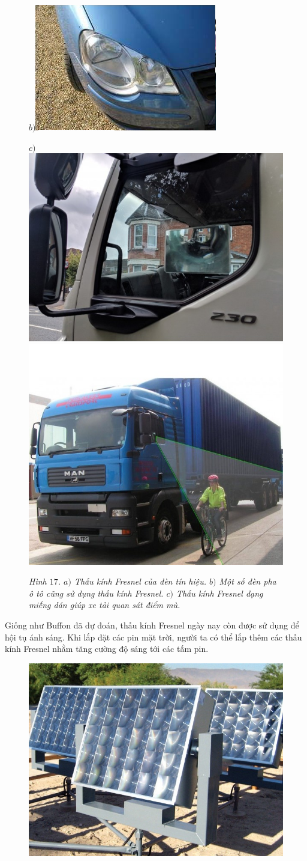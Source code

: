 \begin{multicols}{2}
\begin{figure}[H]
		$b)$\includegraphics[height= 0.3\linewidth]{18b}
		
		$c)$\includegraphics[height= 0.36\linewidth]{18c}
		\includegraphics[height= 0.365\linewidth]{18d}
		\caption{\small\textit{\color{timhieukhoahoc}Hình $17$. $a)$ Thấu kính Fresnel của đèn tín hiệu. $b)$ Một số đèn pha ô tô cũng sử dụng thấu kính Fresnel. $c)$ Thấu kính Fresnel dạng miếng dán giúp xe tải quan sát điểm mù.}}
		\vspace*{-5pt}
	\end{figure}
	Giống như Buffon đã dự đoán, thấu kính Fresnel ngày nay còn được sử dụng để hội tụ ánh sáng. Khi lắp đặt các pin mặt trời, người ta có thể lắp thêm các thấu kính Fresnel nhằm tăng cường độ sáng tới các tấm pin. 
	\begin{figure}[H]
		\vspace*{-5pt}
		\centering
		\captionsetup{labelformat= empty, justification=centering}
		\includegraphics[width= 1\linewidth]{19}

\end{figure}
\end{multicols}
